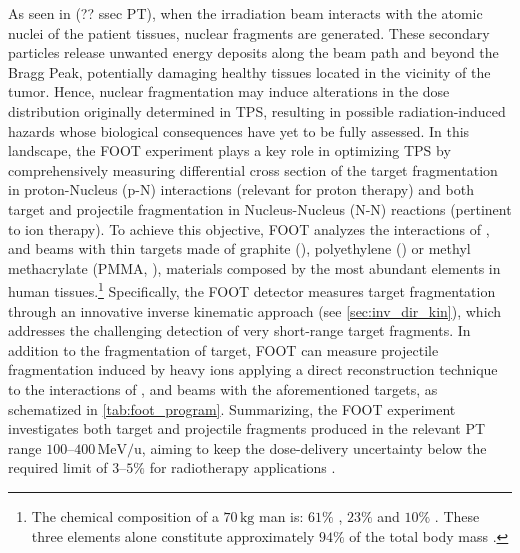 As seen in (?? ssec PT), when the irradiation beam interacts with the atomic nuclei of the patient tissues, nuclear fragments are generated. These secondary particles release unwanted energy deposits along the beam path and beyond the Bragg Peak, potentially damaging healthy tissues located in the vicinity of the tumor. Hence, nuclear fragmentation may induce alterations in the dose distribution originally determined in TPS, resulting in possible radiation-induced hazards whose biological consequences have yet to be fully assessed. In this landscape, the FOOT experiment plays a key role in optimizing TPS by comprehensively measuring differential cross section of the target fragmentation in proton-Nucleus (p-N) interactions (relevant for proton therapy) and both target and projectile fragmentation in Nucleus-Nucleus (N-N) reactions (pertinent to ion therapy). To achieve this objective, FOOT analyzes the interactions of ,  and  beams with thin targets made of graphite (), polyethylene () or methyl methacrylate (PMMA, ), materials composed by the most abundant elements in human tissues.\footnote{The chemical composition of a $70\,\mathrm{kg}$ man is: $61\%$ , $23\%$  and $10\%$ . These three elements alone constitute approximately $94\%$ of the total body mass \cite{haynes2016crc}.} Specifically, the FOOT detector measures target fragmentation through an innovative inverse kinematic approach (see \autoref{sec:inv_dir_kin}), which addresses the challenging detection of very short-range target fragments. In addition to the fragmentation of target, FOOT can measure projectile fragmentation induced by heavy ions applying a direct reconstruction technique to the interactions of ,  and  beams with the aforementioned targets, as schematized in \autoref{tab:foot_program}. Summarizing, the FOOT experiment investigates both target and projectile fragments produced in the relevant PT range $100$--$400\,\mathrm{MeV/u}$, aiming to keep the dose-delivery uncertainty below the required limit of $3$--$5\%$ for radiotherapy applications \cite{vanDeMerwe02012017,Thwaites_2013,PLESKAC2012130}.
